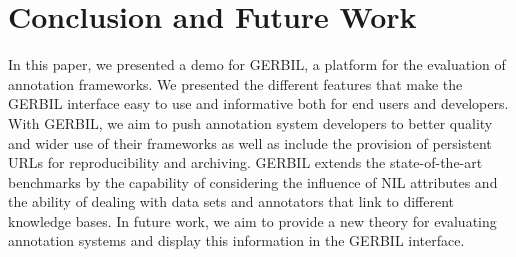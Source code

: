 \section{Conclusion and Future Work}
\label{sec:conclusion}
In this paper, we presented a demo for GERBIL, a platform for the evaluation of annotation frameworks. We presented the different features that make the GERBIL interface easy to use and informative both for end users and developers. 
With GERBIL, we aim to push annotation system developers to better quality and wider use of their frameworks as well as include the provision of persistent URLs for reproducibility and archiving.
GERBIL extends the state-of-the-art benchmarks by the capability of considering the influence of NIL attributes and the ability of dealing with data sets and annotators that link to different knowledge bases. In future work, we aim to provide a new theory for evaluating annotation systems and display this information in the GERBIL interface.

